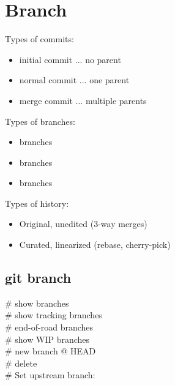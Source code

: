 \section{Branch}
Types of commits:
\begin{itemize}
    \item initial commit ... no parent
    \item normal commit ... one parent
    \item merge commit ... multiple parents
\end{itemize}
Types of branches:
\begin{itemize}
    \item {} branches
    \item {} branches
    \item {} branches
\end{itemize}
Types of history:
\begin{itemize}
    \item Original, unedited (3-way merges)
    \item Curated, linearized (rebase, cherry-pick)
\end{itemize}

\subsection*{git branch}
 \# show branches \\
 \# show tracking branches \\
 \# end-of-road branches \\
 \# show WIP branches \\
 \# new branch @ HEAD \\
 \# delete \\
\# Set upstream branch:\\


